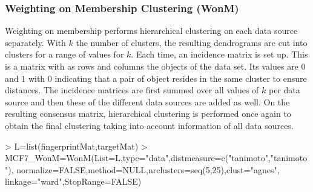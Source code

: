 \documentclass[a4paper]{article}
\begin{document}
\subsubsection{Weighting on Membership Clustering (WonM)}
Weighting on membership performs hierarchical clustering on each data source
separately. With $k$ the number of clusters, the resulting dendrograms
are cut into clusters for a range of values for $k$. Each time, an incidence
matrix is set up. This is a matrix with as rows and columns the objects of the
data set. Its values are $0$ and $1$ with $0$ indicating that a pair of object
resides in the same cluster to ensure distances. The incidence matrices are
first summed over all values of $k$ per data source and then these of the
different data sources are added as well. On the resulting consensus matrix,
hierarchical clustering is performed once again to obtain the final clustering
taking into account information of all data sources.
\begin{Schunk}
\begin{Sinput}
> L=list(fingerprintMat,targetMat)
> MCF7_WonM=WonM(List=L,type="data",distmeasure=c("tanimoto","tanimoto"),
                normalize=FALSE,method=NULL,nrclusters=seq(5,25),clust="agnes",
                linkage="ward",StopRange=FALSE)
\end{Sinput}
\end{Schunk}
\end{document}
